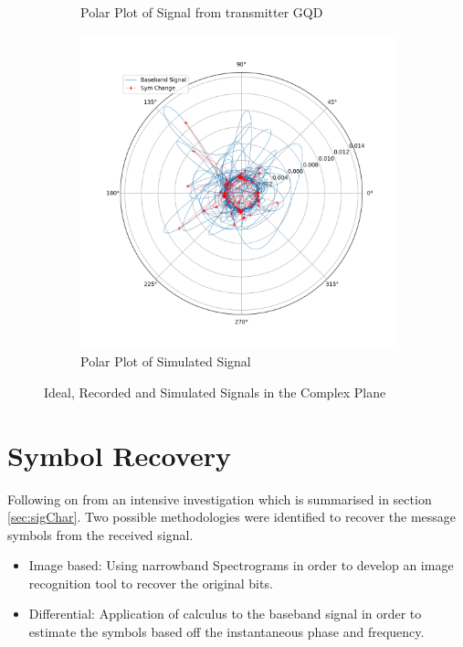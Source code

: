 \begin{figure}[h!]
\begin{subfigure}[b]{0.4\textwidth}
        \caption{\centering Polar Plot of Signal from transmitter GQD}
        \label{fig:polarreal}
    \end{subfigure}
        \begin{subfigure}[b]{0.4\textwidth}
        \centering
       \includegraphics[width = \textwidth]{figs/sim/veri/PolarSim.png}
        \caption{Polar Plot of Simulated Signal}
        \label{fig:polarSim}
    \end{subfigure}
    \caption{Ideal, Recorded and Simulated Signals in the Complex Plane}
    \label{fig:polar}
\end{figure}


\newpage
\section{Symbol Recovery}
Following on from an intensive investigation which is summarised in section \ref{sec:sigChar}. Two possible methodologies were identified to recover the message symbols from the received signal.

\begin{itemize}
    \item Image based: Using narrowband Spectrograms in order to develop an image recognition tool to recover the original bits.
    \item Differential: Application of calculus to the baseband signal in order to estimate the symbols based off the instantaneous phase and frequency.
\end{itemize}

